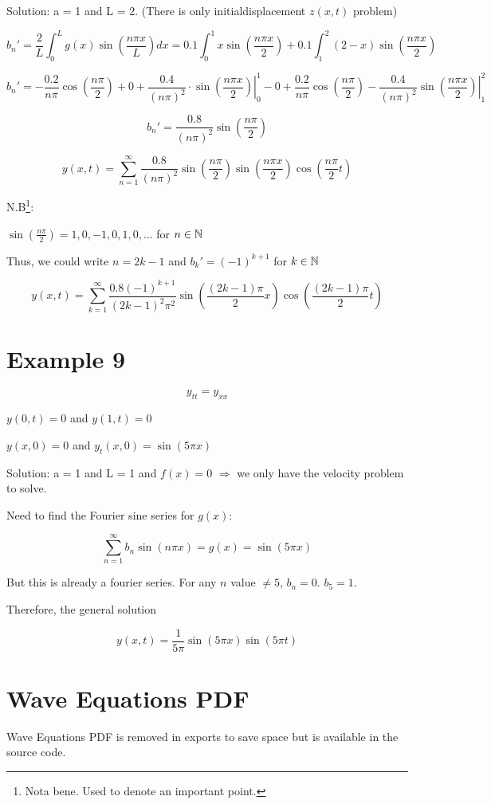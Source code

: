 \documentclass{article}
\begin{document}
Solution: a = 1 and L = 2. (There is only initialdisplacement $z(x,t)$ problem)

$$b_n' = \frac{2}{L} \int_0^L g(x) \sin \left( \frac{ n \pi x}{L} \right) dx = 0.1 \int_0^1 x \sin \left( \frac{ n \pi x}{2} \right) + 0.1\int_1^2 (2-x) \sin \left( \frac{ n \pi x}{2} \right) $$

$$b_n' = - \frac{0.2}{n \pi} \cos \left( \frac{n \pi}{2} \right) + 0 + \frac{0.4}{(n \pi)^2 } \cdot \left. \sin \left( \frac{n \pi x}{2} \right) \right|_0^1  - 0 + \frac{0.2}{n \pi} \cos( \frac{n \pi}{2}) - \frac{0.4}{(n \pi)^2} \left. \sin  \left( \frac{n \pi x}{2} \right) \right|_1^2$$

$$b_n' = \frac{0.8}{(n \pi)^2 } \sin \left( \frac{n \pi}{2} \right)$$


$$y(x,t) = \sum_{n = 1}^\infty \frac{0.8}{(n \pi)^2 } \sin \left( \frac{n \pi}{2} \right) \sin \left( \frac{n \pi x}{2} \right) \cos \left( \frac{n \pi}{2} t \right)$$

N.B\footnote{Nota bene. Used to denote an important point. }:

$\sin (\frac{n \pi}{2}) = 1,0,-1,0,1,0,...$ for $n \in \mathbb{N}$

Thus, we could write $n = 2k-1$ and $b_k' = (-1)^{k+1}$ for $k \in \mathbb{N}$

$$y(x,t) = \sum_{k  =1}^\infty \frac{0.8 (-1)^{k + 1}}{(2k-1)^2 \pi^2} \sin \left( \frac{(2k-1) \pi}{2} x \right) \cos \left( \frac{(2k-1) \pi}{2} t \right)$$

\section{Example 9}

$$y_{tt} = y_{xx}$$

$y(0,t) = 0$ and $y(1,t) = 0$

$y(x,0) = 0$ and $y_t(x,0) = \sin(5 \pi x)$

Solution: a = 1 and L = 1 and $f(x) = 0$ $\Rightarrow$ we only have the velocity problem to solve. 

Need to find the Fourier sine series for $g(x)$:

$$\sum_{n  =1}^\infty b_n \sin(n \pi x) = g(x) = \sin(5 \pi x)$$

But this is already a fourier series. For any $n$ value $\neq 5$, $b_n = 0$. $b_5 = 1$. 

Therefore, the general solution 

$$y(x,t) = \frac{1}{5 \pi} \sin (5 \pi x) \sin(5 \pi t)$$

\section{Wave Equations PDF}

Wave Equations PDF is removed in exports to save space but is available in the source code. 

%
\end{document}

